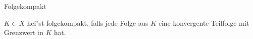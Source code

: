 \documentclass[class=article, crop=false]{standalone}
\begin{document}
\begin{zettel}{Folgekompakt}
\begin{flashcard}[]{}
	\begin{definition}[folgekompakt]
		$K \subset  X$ hei"st folgekompakt, falls jede Folge aus $K$ eine konvergente Teilfolge mit Grenzwert in $K$ hat.
	\end{definition}
\end{flashcard}
\end{zettel}
\end{document}
